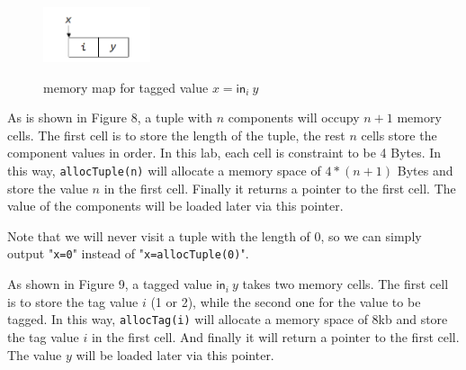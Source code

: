 \documentclass{article}
\theoremstyle{definition}
\theoremstyle{remark}
\numberwithin{equation}{section}
\begin{document}
\begin{figure}
  \centering
  \includegraphics[width=0.28\textwidth]{tag.png}\\
  \caption{memory map for tagged value $x=\textsf{in}_i\ y$}\label{fig:digit}
\end{figure}

As is shown in Figure 8, a tuple with $n$ components will occupy $n+1$ memory
cells. The first cell is to store the length of the tuple, the rest $n$ cells
store the component values in order. In this lab, each cell is constraint to be 4 Bytes.
In this way, \texttt{allocTuple(n)} will allocate a memory space of $4*(n+1)$ Bytes
and store the value $n$ in the first cell. Finally it returns a pointer to
the first cell. The value of the components will be loaded later via this
pointer.

Note that we will never visit a tuple with the length of 0, so we can simply
output "\texttt{x=0}" instead of "\texttt{x=allocTuple(0)}".

As shown in Figure 9, a tagged value $\textsf{in}_i\ y$ takes two memory
cells. The first cell is to store the tag value $i$ (1 or 2), while the second
one for the value to be tagged.
In this way, \texttt{allocTag(i)} will allocate a memory space of 8kb
and store the tag value $i$ in the first cell. And finally it will return a pointer to
the first cell. The value $y$ will be loaded later via this pointer.\\


$\ $\\
\end{document}
